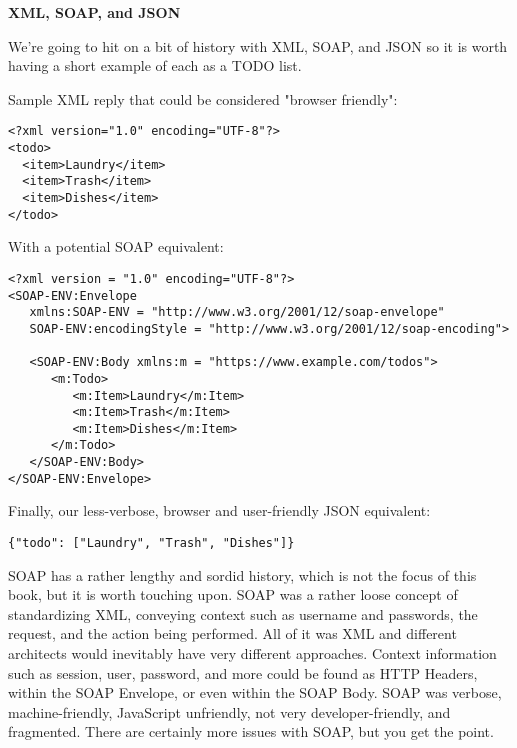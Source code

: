 \begin{sidebar}
\begin{center}
\textbf{XML, SOAP, and JSON}
\end{center}
We're going to hit on a bit of history with XML, SOAP, and JSON so it is worth having a short example of each as a TODO list.

Sample XML reply that could be considered "browser friendly":

\begin{code}
\vspace{-\baselineskip}
\begin{lstlisting}[belowskip=-\baselineskip]
<?xml version="1.0" encoding="UTF-8"?>
<todo>
  <item>Laundry</item>
  <item>Trash</item>
  <item>Dishes</item>
</todo>

\end{lstlisting}
\end{code}

With a potential SOAP equivalent:

\begin{code}
\vspace{-\baselineskip}
\begin{lstlisting}[belowskip=-\baselineskip]
<?xml version = "1.0" encoding="UTF-8"?>
<SOAP-ENV:Envelope
   xmlns:SOAP-ENV = "http://www.w3.org/2001/12/soap-envelope"
   SOAP-ENV:encodingStyle = "http://www.w3.org/2001/12/soap-encoding">

   <SOAP-ENV:Body xmlns:m = "https://www.example.com/todos">
      <m:Todo>
         <m:Item>Laundry</m:Item>
         <m:Item>Trash</m:Item>
         <m:Item>Dishes</m:Item>
      </m:Todo>
   </SOAP-ENV:Body>
</SOAP-ENV:Envelope>

\end{lstlisting}
\end{code}

Finally, our less-verbose, browser and user-friendly JSON equivalent:

\begin{code}
\vspace{-\baselineskip}
\begin{lstlisting}[belowskip=-\baselineskip]
{"todo": ["Laundry", "Trash", "Dishes"]}
\end{lstlisting}
\end{code}

\end{sidebar}

SOAP has a rather lengthy and sordid history, which is not the focus of this book, but it is worth touching upon.  SOAP was a rather loose concept of standardizing XML, conveying context such as username and passwords, the request, and the action being performed.  All of it was XML and different architects would inevitably have very different approaches.  Context information such as session, user, password, and more could be found as HTTP Headers, within the SOAP Envelope, or even within the SOAP Body.  SOAP was verbose, machine-friendly, JavaScript unfriendly, not very developer-friendly, and fragmented.  There are certainly more issues with SOAP, but you get the point.

